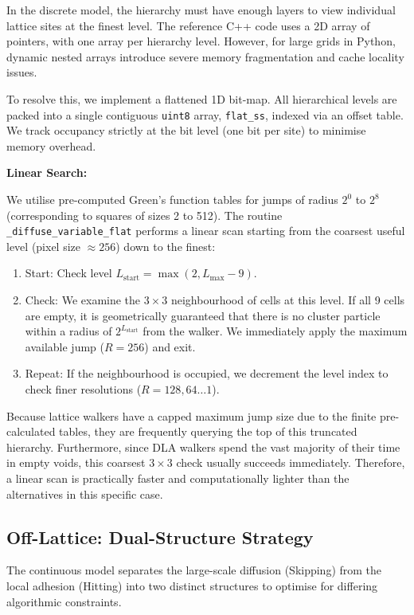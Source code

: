 \documentclass[12pt, a4paper, oneside]{report}
\theoremstyle{remark}
\begin{document}
In the discrete model, the hierarchy must have enough layers to view individual lattice sites at the finest level. The reference C++ code uses a 2D array of pointers, with one array per hierarchy level. However, for large grids in Python, dynamic nested arrays introduce severe memory fragmentation and cache locality issues.

To resolve this, we implement a flattened 1D bit-map. All hierarchical levels are packed into a single contiguous \texttt{uint8} array, \texttt{flat\_ss}, indexed via an offset table. We track occupancy strictly at the bit level (one bit per site) to minimise memory overhead.

\noindent \textbf{Linear Search:}

We utilise pre-computed Green's function tables for jumps of radius $2^0$ to $2^8$ (corresponding to squares of sizes 2 to 512). The routine \texttt{\_diffuse\_variable\_flat} performs a linear scan starting from the coarsest useful level (pixel size $\approx 256$) down to the finest:
\begin{enumerate}
    \item Start: Check level $L_{\text{start}} = \max(2, L_{\text{max}} - 9)$.
    \item Check: We examine the $3 \times 3$ neighbourhood of cells at this level. If all 9 cells are empty, it is geometrically guaranteed that there is no cluster particle within a radius of $2^{L_{\text{start}}}$ from the walker. We immediately apply the maximum available jump ($R=256$) and exit.
    \item Repeat: If the neighbourhood is occupied, we decrement the level index to check finer resolutions ($R=128, 64 \dots 1$).
\end{enumerate}

Because lattice walkers have a capped maximum jump size due to the finite pre-calculated tables, they are frequently querying the top of this truncated hierarchy. Furthermore, since DLA walkers spend the vast majority of their time in empty voids, this coarsest $3 \times 3$ check usually succeeds immediately. Therefore, a linear scan is practically faster and computationally lighter than the alternatives in this specific case.

\subsection{Off-Lattice: Dual-Structure Strategy}
The continuous model separates the large-scale diffusion (Skipping) from the local adhesion (Hitting) into two distinct structures to optimise for differing algorithmic constraints.
\end{document}
